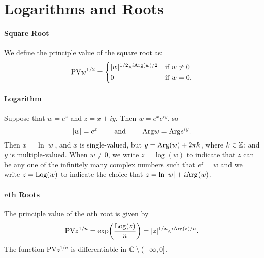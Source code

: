 \section{Logarithms and Roots}

\paragraph{Square Root}
We define the principle value of the square root as:
\[\mathrm{PV}w^{1/2} = \begin{cases}
    |w|^{1/2}e^{i\mathrm{Arg}(w)/2} & \text{if } w \neq 0 \\
    0 & \text{if } w = 0.
\end{cases}\]

\paragraph{Logarithm}
Suppose that \(w = e^z\) and \(z = x + iy\). Then \(w = e^xe^{iy}\), so
\[|w| = e^x \qquad \text{ and } \qquad \mathrm{Arg} w = \mathrm{Arg} e^{iy}.\]
Then \(x = \ln|w|\), and \(x\) is single-valued, but \(y = \mathrm{Arg}(w) + 2\pi k\), where \(k \in \mathbb{Z}\); and \(y\) is multiple-valued. When \(w \neq 0\), we write \(z = \log(w)\) to indicate that \(z\) can be any one of the infinitely many complex numbers such that \(e^z = w\) and we write \(z = \mathrm{Log}(w)\) to indicate the choice that \(z = \ln|w| + i\mathrm{Arg}(w)\).

\paragraph{\(n\)th Roots}
The principle value of the \(n\)th root is given by
\[\mathrm{PV} z^{1/n} = \exp(\frac{\mathrm{Log}(z)}{n}) = |z|^{1/n}e^{i\mathrm{Arg}(z)/n}.\]
The function \(\mathrm{PV}z^{1/n}\) is differentiable in \(\mathbb{C} \setminus (-\infty, 0]\).